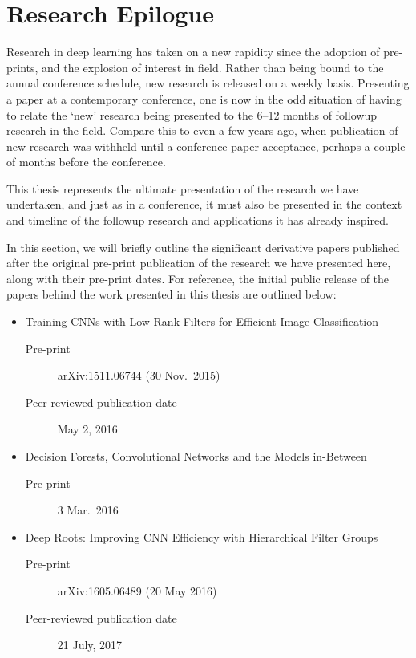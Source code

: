 \documentclass[thesis]{subfiles}
\begin{document}

\chapter{Research Epilogue}
\label{epilogue}
Research in deep learning has taken on a new rapidity since the adoption of pre-prints, and the explosion of interest in field. Rather than being bound to the annual conference schedule, new research is released on a weekly basis. Presenting a paper at a contemporary conference, one is now in the odd situation of having to relate the `new' research being presented to the 6--12 months of followup research in the field. Compare this to even a few years ago, when publication of new research was withheld until a conference paper acceptance, perhaps a couple of months before the conference.

This thesis represents the ultimate presentation of the research we have undertaken, and just as in a conference, it must also be presented in the context and timeline of the followup research and applications it has already inspired.

In this section, we will briefly outline the significant derivative papers published after the original pre-print publication of the research we have presented here, along with their pre-print dates. For reference, the initial public release of the papers behind the work presented in this thesis are outlined below:

\begin{itemize}
    \item Training CNNs with Low-Rank Filters for Efficient Image Classification~\citep{Ioannou2016}
    \begin{description}
        \item[Pre-print] arXiv:1511.06744 (30 Nov.\ 2015)
        \item[Peer-reviewed publication date] May 2, 2016
    \end{description}
    \item Decision Forests, Convolutional Networks and the Models in-Between~\citep{Ioannou2015}
    \begin{description}
        \item[Pre-print] 3 Mar.\ 2016
    \end{description}
    \item Deep Roots: Improving CNN Efficiency with Hierarchical Filter Groups~\citep{ioannou2016e}
    \begin{description}
        \item[Pre-print] arXiv:1605.06489 (20 May 2016)
        \item[Peer-reviewed publication date] 21 July, 2017
    \end{description}
\end{itemize}
\end{document}
